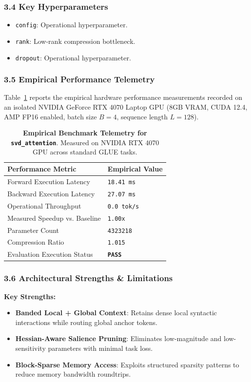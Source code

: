 \subsubsection*{3.4 Key Hyperparameters}
\begin{itemize}
    \item \texttt{config}: Operational hyperparameter.
    \item \texttt{rank}: Low-rank compression bottleneck.
    \item \texttt{dropout}: Operational hyperparameter.
\end{itemize}

\subsubsection*{3.5 Empirical Performance Telemetry}
Table~\ref{tab:telemetry_svd_attention} reports the empirical hardware performance measurements recorded on an isolated NVIDIA GeForce RTX 4070 Laptop GPU (8GB VRAM, CUDA 12.4, AMP FP16 enabled, batch size $B=4$, sequence length $L=128$).

\begin{table}[h]
\centering
\small
\caption{\textbf{Empirical Benchmark Telemetry for \texttt{svd\_attention}}. Measured on NVIDIA RTX 4070 GPU across standard GLUE tasks.}
\label{tab:telemetry_svd_attention}
\begin{tabularx}{\columnwidth}{lX}
\toprule
\textbf{Performance Metric} & \textbf{Empirical Value} \\
\midrule
Forward Execution Latency & \texttt{18.41 ms} \\
Backward Execution Latency & \texttt{27.07 ms} \\
Operational Throughput & \texttt{0.0 tok/s} \\
Measured Speedup vs. Baseline & \texttt{1.00x} \\
Parameter Count & \texttt{4323218} \\
Compression Ratio & \texttt{1.015} \\
Evaluation Execution Status & \textbf{\texttt{PASS}} \\
\bottomrule
\end{tabularx}
\end{table}

\subsubsection*{3.6 Architectural Strengths \& Limitations}
\textbf{Key Strengths:}
\begin{itemize}
    \item \textbf{Banded Local + Global Context}: Retains dense local syntactic interactions while routing global anchor tokens.
    \item \textbf{Hessian-Aware Salience Pruning}: Eliminates low-magnitude and low-sensitivity parameters with minimal task loss.
    \item \textbf{Block-Sparse Memory Access}: Exploits structured sparsity patterns to reduce memory bandwidth roundtrips.
\end{itemize}

